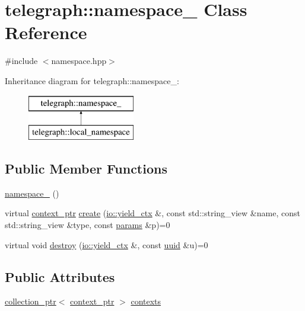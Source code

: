 \hypertarget{classtelegraph_1_1namespace__}{}\section{telegraph\+:\+:namespace\+\_\+ Class Reference}
\label{classtelegraph_1_1namespace__}


{\ttfamily \#include $<$namespace.\+hpp$>$}

Inheritance diagram for telegraph\+:\+:namespace\+\_\+\+:\begin{figure}[H]
\begin{center}
\leavevmode
\includegraphics[height=2.000000cm]{classtelegraph_1_1namespace__}
\end{center}
\end{figure}
\subsection*{Public Member Functions}
\begin{DoxyCompactItemize}
\item 
\hyperlink{classtelegraph_1_1namespace___a0ea0a99c1d31a5e867ccd0bd8f3d0917}{namespace\+\_\+} ()
\item 
virtual \hyperlink{namespacetelegraph_a332e681f0d44a1308cf3a013a9dd140f}{context\+\_\+ptr} \hyperlink{classtelegraph_1_1namespace___ab7a20d98f18494d8e11aada783221dd5}{create} (\hyperlink{structboost_1_1asio_1_1yield__ctx}{io\+::yield\+\_\+ctx} \&, const std\+::string\+\_\+view \&name, const std\+::string\+\_\+view \&type, const \hyperlink{classtelegraph_1_1params}{params} \&p)=0
\item 
virtual void \hyperlink{classtelegraph_1_1namespace___ad077446ed8ad4b099ddc050067e14f9d}{destroy} (\hyperlink{structboost_1_1asio_1_1yield__ctx}{io\+::yield\+\_\+ctx} \&, const \hyperlink{namespacetelegraph_a51ee91d7eaeef067f7ccac2b170e5d59}{uuid} \&u)=0
\end{DoxyCompactItemize}
\subsection*{Public Attributes}
\begin{DoxyCompactItemize}
\item 
\hyperlink{namespacetelegraph_a4fa3678b3fd260dc79a98bea50d582fd}{collection\+\_\+ptr}$<$ \hyperlink{namespacetelegraph_a332e681f0d44a1308cf3a013a9dd140f}{context\+\_\+ptr} $>$ \hyperlink{classtelegraph_1_1namespace___a04ffdef6fc2b8c0ed4b02ba3f039b27a}{contexts}
\end{DoxyCompactItemize}


